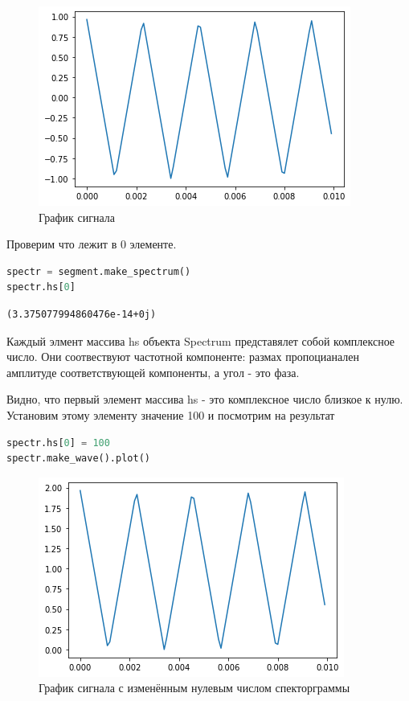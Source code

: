 \begin{figure}[H]
	\begin{center}
		\includegraphics[scale=1]{fig/lab02/lab02_6.png}
		\caption{График сигнала}
	\end{center}
\end{figure}

Проверим что лежит в 0 элементе.

\begin{lstlisting}[language=Python]
spectr = segment.make_spectrum()
spectr.hs[0]
\end{lstlisting}

\begin{lstlisting}
(3.375077994860476e-14+0j)
\end{lstlisting}
Каждый элмент массива hs объекта Spectrum представялет собой комплексное число. Они соотвествуют частотной компоненте: размах пропоцианален амплитуде соответствующей компоненты, а угол - это фаза.

\noindent Видно, что первый элемент массива hs - это комплексное число близкое к нулю. Установим этому элементу значение 100 и посмотрим на результат
\begin{lstlisting}[language=Python]
spectr.hs[0] = 100
spectr.make_wave().plot()
\end{lstlisting}

\begin{figure}[H]
	\begin{center}
		\includegraphics[scale=1]{fig/lab02/lab02_7.png}
		\caption{График сигнала с изменённым нулевым числом спекторграммы}
	\end{center}
\end{figure}


